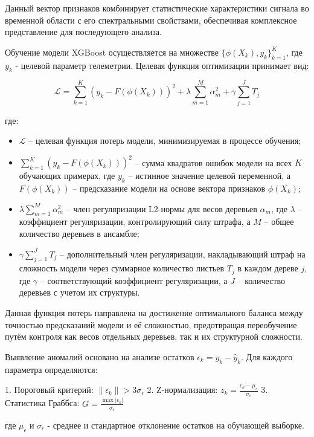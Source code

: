 Данный вектор признаков комбинирует статистические характеристики сигнала во
временной области с его спектральными свойствами, обеспечивая комплексное
представление для последующего анализа.

Обучение модели XGBoost осуществляется на множестве $\{\phi(X_k),
	y_k\}_{k=1}^K$, где $y_k$ - целевой параметр телеметрии. Целевая функция
оптимизации принимает вид:

\[
	\mathcal{L} = \sum_{k=1}^K \left( y_k - F(\phi(X_k)) \right)^2 + \lambda \sum_{m=1}^M \alpha_m^2 + \gamma \sum_{j=1}^J T_j
\]

\noindent где:
\begin{itemize}
	\item $\mathcal{L}$ -- целевая функция потерь модели, минимизируемая в процессе обучения;
	\item $\sum_{k=1}^K \left( y_k - F(\phi(X_k)) \right)^2$ -- сумма квадратов ошибок модели на всех $K$ обучающих примерах, где $y_k$ -- истинное значение целевой переменной, а $F(\phi(X_k))$ -- предсказание модели на основе вектора признаков $\phi(X_k)$;
	\item $\lambda \sum_{m=1}^M \alpha_m^2$ -- член регуляризации L2-нормы для весов деревьев $\alpha_m$, где $\lambda$ -- коэффициент регуляризации, контролирующий силу штрафа, а $M$ -- общее количество деревьев в ансамбле;
	\item $\gamma \sum_{j=1}^J T_j$ -- дополнительный член регуляризации, накладывающий штраф на сложность модели через суммарное количество листьев $T_j$ в каждом дереве $j$, где $\gamma$ -- соответствующий коэффициент регуляризации, а $J$ -- количество деревьев с учетом их структуры.
\end{itemize}

Данная функция потерь направлена на достижение оптимального баланса между
точностью предсказаний модели и её сложностью, предотвращая переобучение путём
контроля как весов отдельных деревьев, так и их структурной сложности.

Выявление аномалий основано на анализе остатков $\epsilon_k = y_k - \hat{y}_k$. Для каждого параметра определяются:

1. Пороговый критерий: $\|\epsilon_k\| > 3\sigma_\epsilon$
2. Z-нормализация: $z_k = \frac{\epsilon_k - \mu_\epsilon}{\sigma_\epsilon}$
3. Статистика Граббса: $G = \frac{\max |\epsilon_k|}{\sigma_\epsilon}$

где $\mu_\epsilon$ и $\sigma_\epsilon$ - среднее и стандартное отклонение остатков на обучающей выборке.

